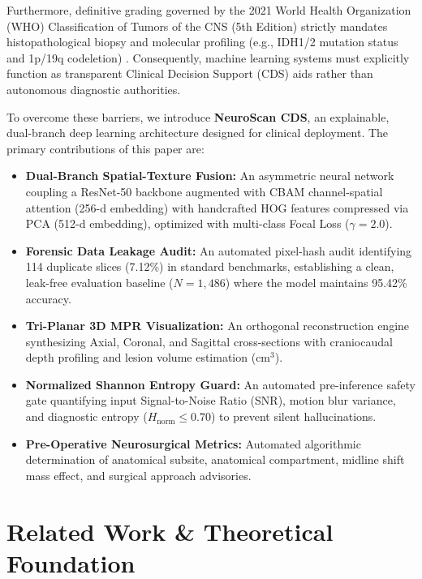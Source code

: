 \documentclass[journal,twocolumn,10pt]{IEEEtran}
\begin{document}
Furthermore, definitive grading governed by the 2021 World Health Organization (WHO) Classification of Tumors of the CNS (5th Edition) strictly mandates histopathological biopsy and molecular profiling (e.g., IDH1/2 mutation status and 1p/19q codeletion) \cite{louis2021who}. Consequently, machine learning systems must explicitly function as transparent Clinical Decision Support (CDS) aids rather than autonomous diagnostic authorities.

To overcome these barriers, we introduce \textbf{NeuroScan CDS}, an explainable, dual-branch deep learning architecture designed for clinical deployment. The primary contributions of this paper are:
\begin{itemize}
    \item \textbf{Dual-Branch Spatial-Texture Fusion:} An asymmetric neural network coupling a ResNet-50 backbone augmented with CBAM channel-spatial attention (256-d embedding) with handcrafted HOG features compressed via PCA (512-d embedding), optimized with multi-class Focal Loss ($\gamma = 2.0$).
    \item \textbf{Forensic Data Leakage Audit:} An automated pixel-hash audit identifying 114 duplicate slices (7.12\%) in standard benchmarks, establishing a clean, leak-free evaluation baseline ($N = 1,486$) where the model maintains 95.42\% accuracy.
    \item \textbf{Tri-Planar 3D MPR Visualization:} An orthogonal reconstruction engine synthesizing Axial, Coronal, and Sagittal cross-sections with craniocaudal depth profiling and lesion volume estimation ($\text{cm}^3$).
    \item \textbf{Normalized Shannon Entropy Guard:} An automated pre-inference safety gate quantifying input Signal-to-Noise Ratio (SNR), motion blur variance, and diagnostic entropy ($H_{\text{norm}} \le 0.70$) to prevent silent hallucinations.
    \item \textbf{Pre-Operative Neurosurgical Metrics:} Automated algorithmic determination of anatomical subsite, anatomical compartment, midline shift mass effect, and surgical approach advisories.
\end{itemize}

\section{Related Work \& Theoretical Foundation}
\end{document}
